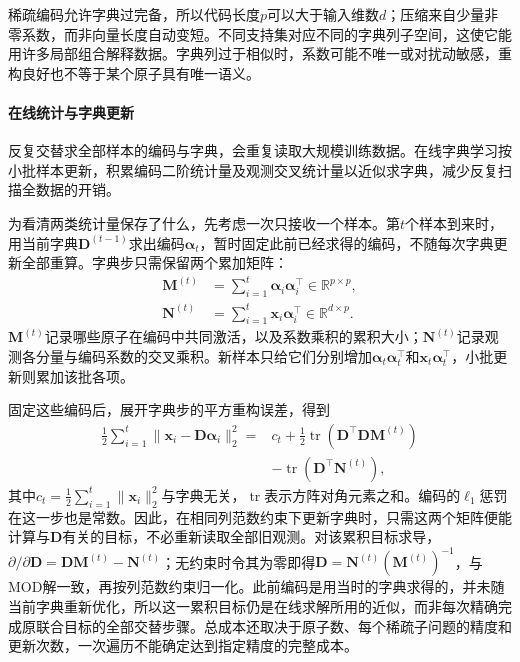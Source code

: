 稀疏编码允许字典过完备，所以代码长度$p$可以大于输入维数$d$；压缩来自少量非零系数，而非向量长度自动变短。不同支持集对应不同的字典列子空间，这使它能用许多局部组合解释数据。字典列过于相似时，系数可能不唯一或对扰动敏感，重构良好也不等于某个原子具有唯一语义。

\paragraph{在线统计与字典更新}

反复交替求全部样本的编码与字典，会重复读取大规模训练数据。在线字典学习按小批样本更新，积累编码二阶统计量及观测交叉统计量以近似求字典，减少反复扫描全数据的开销。

为看清两类统计量保存了什么，先考虑一次只接收一个样本。第$t$个样本到来时，用当前字典$\bm D^{(t-1)}$求出编码$\bm\alpha_t$，暂时固定此前已经求得的编码，不随每次字典更新全部重算。字典步只需保留两个累加矩阵：
\[
 \begin{aligned}
 \bm M^{(t)}
   &=\sum_{i=1}^{t}\bm\alpha_i\bm\alpha_i^\top
     \in\mathbb R^{p\times p},\\
 \bm N^{(t)}
   &=\sum_{i=1}^{t}\bm x_i\bm\alpha_i^\top
     \in\mathbb R^{d\times p}.
 \end{aligned}
\]
$\bm M^{(t)}$记录哪些原子在编码中共同激活，以及系数乘积的累积大小；$\bm N^{(t)}$记录观测各分量与编码系数的交叉乘积。新样本只给它们分别增加$\bm\alpha_t\bm\alpha_t^\top$和$\bm x_t\bm\alpha_t^\top$，小批更新则累加该批各项。

固定这些编码后，展开字典步的平方重构误差，得到
\[
 \begin{aligned}
 \frac12\sum_{i=1}^{t}
    \lVert\bm x_i-\bm D\bm\alpha_i\rVert_2^2
 ={}&c_t+\frac12\operatorname{tr}
            (\bm D^\top\bm D\bm M^{(t)})\\
    &-\operatorname{tr}(\bm D^\top\bm N^{(t)}),
 \end{aligned}
\]
其中$c_t=\tfrac12\sum_{i=1}^{t}\lVert\bm x_i\rVert_2^2$与字典无关，$\operatorname{tr}$表示方阵对角元素之和。编码的$\ell_1$惩罚在这一步也是常数。因此，在相同列范数约束下更新字典时，只需这两个矩阵便能计算与$\bm D$有关的目标，不必重新读取全部旧观测。对该累积目标求导，$\partial/\partial\bm D=\bm D\bm M^{(t)}-\bm N^{(t)}$；无约束时令其为零即得$\bm D=\bm N^{(t)}(\bm M^{(t)})^{-1}$，与MOD解一致，再按列范数约束归一化。此前编码是用当时的字典求得的，并未随当前字典重新优化，所以这一累积目标仍是在线求解所用的近似，而非每次精确完成原联合目标的全部交替步骤。总成本还取决于原子数、每个稀疏子问题的精度和更新次数，一次遍历不能确定达到指定精度的完整成本。

